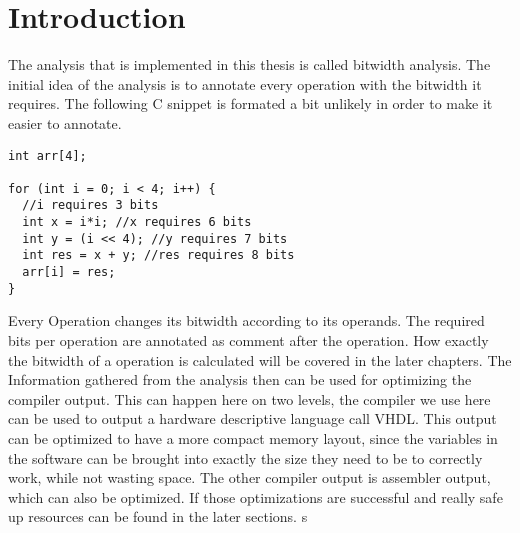 \chapter{Introduction}\label{sec:intro}

The analysis that is implemented in this thesis is called bitwidth analysis.
The initial idea of the analysis is to annotate every operation with the bitwidth it requires. The following C snippet is formated a bit unlikely in order to make it easier to annotate.
\begin{lstlisting}[frame=single]
int arr[4];

for (int i = 0; i < 4; i++) {
  //i requires 3 bits
  int x = i*i; //x requires 6 bits
  int y = (i << 4); //y requires 7 bits
  int res = x + y; //res requires 8 bits
  arr[i] = res;
}
\end{lstlisting}
Every Operation changes its bitwidth according to its operands. The required bits per operation are annotated as comment after the operation.
How exactly the bitwidth of a operation is calculated will be covered in the later chapters.
The Information gathered from the analysis then can be used for optimizing the compiler output. This can happen here on two levels, the compiler we use here can be used to output a hardware descriptive language call VHDL. This output can be optimized to have a more compact memory layout, since the variables in the software can be brought into exactly the size they need to be to correctly work, while not wasting space.
The other compiler output is assembler output, which can also be optimized. If those optimizations are successful and really safe up resources can be found in the later sections.
s